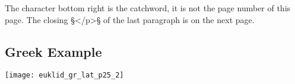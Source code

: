 \begin{note}
The character bottom right is the catchword, it is not the page number of this page. The closing §</p>§ of the last paragraph is on the next page.

\end{note}


\subsection{Greek Example}
\label{section greek example}

\texttt{[image: euklid\_gr\_lat\_p25\_2]}
\clearpage

